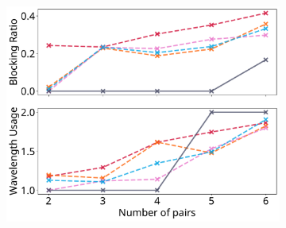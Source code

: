 \begin{figure}[H]
\begin{subfigure}{0.32\textwidth}
	\includegraphics[width=\textwidth]{pictures/plots/n_pairs/x-2-2-s.pdf}
\end{subfigure}
	\label{fig:pairs_before}
\end{figure}
